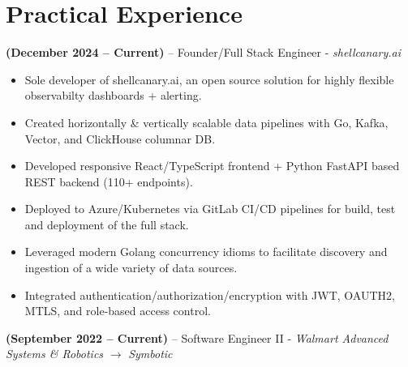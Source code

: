 \documentclass[11pt,a4paper]{article}
\newcommand{\jobentry}[2]{
  \vspace{0.5\baselineskip}\textbf{#1} -- #2 
}
\begin{document}
\section*{Practical Experience}
\jobentry{(December 2024 -- Current)}{Founder/Full Stack Engineer - \textit{shellcanary.ai}}
\begin{itemize}
\item Sole developer of shellcanary.ai, an open source solution for highly flexible observabilty dashboards + alerting.
\item Created horizontally \& vertically scalable data pipelines with Go, Kafka, Vector, and ClickHouse columnar DB.
\item Developed responsive React/TypeScript frontend + Python FastAPI based REST backend (110+ endpoints).
\item Deployed to Azure/Kubernetes via GitLab CI/CD pipelines for build, test and deployment of the full stack.
\item Leveraged modern Golang concurrency idioms to facilitate discovery and ingestion of a wide variety of data sources.
\item Integrated authentication/authorization/encryption with JWT, OAUTH2, MTLS, and role-based access control.
\end{itemize}
\jobentry{(September 2022 -- Current)}{Software Engineer II - \textit{Walmart Advanced Systems \& Robotics}  $\rightarrow$  \textit{Symbotic}}
\end{document}

